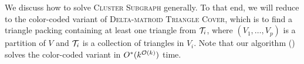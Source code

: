 We discuss how to solve \textsc{Cluster Subgraph} generally.
To that end, we will reduce to the color-coded variant of \textsc{Delta-matroid Triangle Cover}, which is to find a triangle packing containing at least one triangle from $\mathcal T_i$, where $(V_1, \dots, V_p)$ is a partition of $V$ and $\mathcal T_i$ is a collection of triangles in $V_i$.
Note that our algorithm () solves the color-coded variant in $O^*(k^{\mathcal{O}(k)})$ time.


